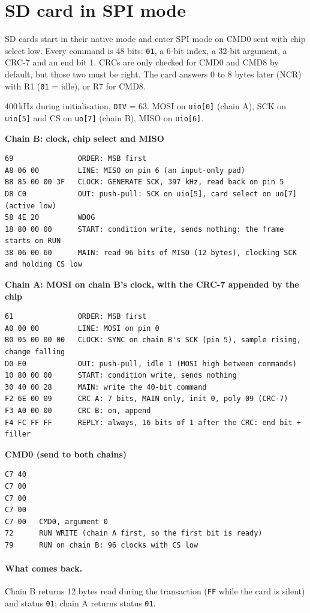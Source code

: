 \documentclass[11pt,a4paper]{article}
\newcommand{\sig}[1]{\texttt{#1}}
\newcommand{\progtitle}[1]{\par\smallskip\textbf{\small\color{accent}#1}\par\nopagebreak}
\newcommand{\facts}[1]{\par\noindent\colorbox{codebg}{\parbox{\dimexpr\linewidth-2\fboxsep}{\small #1}}\par}
\begin{document}
\section{SD card in SPI mode}
SD cards start in their native mode and enter SPI mode on CMD0 sent with chip select low. Every command is 48 bits: \texttt{01}, a 6-bit index, a 32-bit argument, a CRC-7 and an end bit 1. CRCs are only checked for CMD0 and CMD8 by default, but those two must be right. The card answers 0 to 8 bytes later (NCR) with R1 (\texttt{01} = idle), or R7 for CMD8.
\facts{400\,kHz during initialisation, \sig{DIV} = 63. MOSI on \sig{uio[0]} (chain A), SCK on \sig{uio[5]} and CS on \sig{uo[7]} (chain B), MISO on \sig{uio[6]}.}
\progtitle{Chain B: clock, chip select and MISO}
\begin{lstlisting}
69               ORDER: MSB first
A8 06 00         LINE: MISO on pin 6 (an input-only pad)
B8 85 00 00 3F   CLOCK: GENERATE SCK, 397 kHz, read back on pin 5
D8 C0            OUT: push-pull: SCK on uio[5], card select on uo[7] (active low)
58 4E 20         WDOG
18 80 00 00      START: condition write, sends nothing: the frame starts on RUN
38 06 00 60      MAIN: read 96 bits of MISO (12 bytes), clocking SCK and holding CS low
\end{lstlisting}
\progtitle{Chain A: MOSI on chain B's clock, with the CRC-7 appended by the chip}
\begin{lstlisting}
61               ORDER: MSB first
A0 00 00         LINE: MOSI on pin 0
B0 05 00 00 00   CLOCK: SYNC on chain B's SCK (pin 5), sample rising, change falling
D0 E0            OUT: push-pull, idle 1 (MOSI high between commands)
10 80 00 00      START: condition write, sends nothing
30 40 00 28      MAIN: write the 40-bit command
F2 6E 00 09      CRC A: 7 bits, MAIN only, init 0, poly 09 (CRC-7)
F3 A0 00 00      CRC B: on, append
F4 FC FF FF      REPLY: always, 16 bits of 1 after the CRC: end bit + filler
\end{lstlisting}
\progtitle{CMD0 (send to both chains)}
\begin{lstlisting}
C7 40   
C7 00   
C7 00   
C7 00   
C7 00   CMD0, argument 0
72      RUN WRITE (chain A first, so the first bit is ready)
79      RUN on chain B: 96 clocks with CS low
\end{lstlisting}
\paragraph{What comes back.} Chain B returns 12 bytes read during the transaction (\texttt{FF} while the card is silent) and status \texttt{01}; chain A returns status \texttt{01}.
\end{document}
